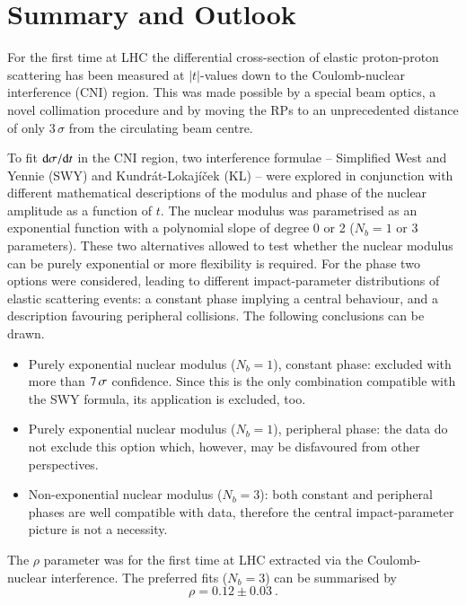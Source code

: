 \section{Summary and Outlook}
\label{sec:summary}
For the first time at LHC the differential cross-section of elastic proton-proton scattering has been measured at $|t|$-values down to the Coulomb-nuclear interference (CNI) region. This was made possible by a special beam optics, a novel collimation procedure and by moving the RPs to an unprecedented distance of only $3\,\sigma$ from the circulating beam centre.

To fit ${\rm d}\sigma/{\rm d} t$ in the CNI region, two interference formulae -- Simplified West and Yennie (SWY) and Kundr\' at-Lokaj\' i\v cek (KL) -- 
were explored in conjunction with different mathematical descriptions of the modulus and phase of the nuclear amplitude as a function of $t$. The nuclear modulus was parametrised as an exponential function with a polynomial slope of degree 0 or 2 ($N_b=1$ or $3$ parameters). These two alternatives allowed to test whether the nuclear modulus can be purely exponential or more flexibility is required. For the phase two options were considered, leading to different impact-parameter distributions of elastic scattering events: a constant phase implying a central behaviour, and a description favouring peripheral collisions. The following conclusions can be drawn.
\begin{itemize}
\item Purely exponential nuclear modulus ($N_b=1$), constant phase: excluded with more than $7\,{\rm \sigma}$ confidence. Since this is the only combination compatible with the SWY formula, its application is excluded, too.
\item Purely exponential nuclear modulus ($N_b=1$), peripheral phase: the data do not exclude this option which, however, may be disfavoured from other perspectives.
\item Non-exponential nuclear modulus ($N_b=3$): both constant and peripheral phases are well compatible with data, therefore the central impact-parameter picture is not a necessity.
\end{itemize}

The $\rho$ parameter was for the first time at LHC extracted via the Coulomb-nuclear interference. The preferred fits ($N_b=3$) can be summarised by
\begin{equation}
\label{eq:rho final}
\rho = 0.12 \pm 0.03\ .
\end{equation}

